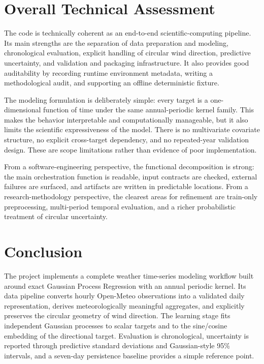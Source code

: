 \documentclass[11pt,a4paper]{article}
\begin{document}
\section{Overall Technical Assessment}
The code is technically coherent as an end-to-end scientific-computing pipeline. Its main strengths are the separation of data preparation and modeling, chronological evaluation, explicit handling of circular wind direction, predictive uncertainty, and validation and packaging infrastructure. It also provides good auditability by recording runtime environment metadata, writing a methodological audit, and supporting an offline deterministic fixture.

The modeling formulation is deliberately simple: every target is a one-dimensional function of time under the same annual-periodic kernel family. This makes the behavior interpretable and computationally manageable, but it also limits the scientific expressiveness of the model. There is no multivariate covariate structure, no explicit cross-target dependency, and no repeated-year validation design. These are scope limitations rather than evidence of poor implementation.

From a software-engineering perspective, the functional decomposition is strong: the main orchestration function is readable, input contracts are checked, external failures are surfaced, and artifacts are written in predictable locations. From a research-methodology perspective, the clearest areas for refinement are train-only preprocessing, multi-period temporal evaluation, and a richer probabilistic treatment of circular uncertainty.

\section{Conclusion}
The project implements a complete weather time-series modeling workflow built around exact Gaussian Process Regression with an annual periodic kernel. Its data pipeline converts hourly Open-Meteo observations into a validated daily representation, derives meteorologically meaningful aggregates, and explicitly preserves the circular geometry of wind direction. The learning stage fits independent Gaussian processes to scalar targets and to the sine/cosine embedding of the directional target. Evaluation is chronological, uncertainty is reported through predictive standard deviations and Gaussian-style 95\% intervals, and a seven-day persistence baseline provides a simple reference point.
\end{document}

